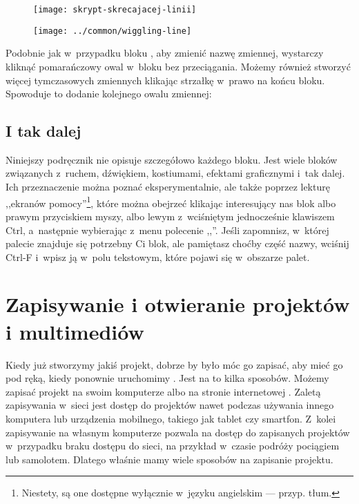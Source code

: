 \documentclass[a4paper]{report}
\begin{document}
\begin{figure}[H]
\begin{minipage}{0.5\textwidth}
\centering
\texttt{[image: skrypt-skrecajacej-linii]}%
\end{minipage}%
\begin{minipage}{0.5\textwidth}
\centering
\texttt{[image: ../common/wiggling-line]}
\end{minipage}%
\end{figure}

Podobnie jak w~przypadku bloku , aby zmienić nazwę zmiennej, wystarczy kliknąć pomarańczowy owal w~bloku  bez przeciągania. Możemy również stworzyć więcej tymczasowych zmiennych klikając strzałkę w~prawo na końcu bloku. Spowoduje to dodanie kolejnego owalu zmiennej:\nopagebreak


\section{I tak dalej}

Niniejszy podręcznik nie opisuje szczegółowo każdego bloku. Jest wiele bloków związanych z~ruchem, dźwiękiem, kostiumami, efektami graficznymi i~tak dalej. Ich przeznaczenie można poznać eksperymentalnie, ale także poprzez lekturę ,,ekranów pomocy''\footnote{Niestety, są one dostępne wyłącznie w~języku angielskim --- przyp. tłum.}, które można obejrzeć klikając interesujący nas blok albo prawym przyciskiem myszy, albo lewym z~wciśniętym jednocześnie klawiszem Ctrl, a~następnie wybierając z~menu polecenie ,,''. Jeśli zapomnisz, w~której palecie znajduje się potrzebny Ci blok, ale pamiętasz choćby część nazwy, wciśnij Ctrl-F i~wpisz ją w~polu tekstowym, które pojawi się w~obszarze palet.

\chapter{Zapisywanie i otwieranie projektów i multimediów}
\label{ch:zapisywanie-i-otwieranie-projektów-i-multimediów}

Kiedy już stworzymy jakiś projekt, dobrze by było móc go zapisać, aby mieć go pod ręką, kiedy ponownie uruchomimy . Jest na to kilka sposobów. Możemy zapisać projekt na swoim komputerze albo na stronie internetowej . Zaletą zapisywania w~sieci jest dostęp do projektów nawet podczas używania innego komputera lub urządzenia mobilnego, takiego jak tablet czy smartfon. Z~kolei zapisywanie na własnym komputerze pozwala na dostęp do zapisanych projektów w~przypadku braku dostępu do sieci, na przykład w~czasie podróży pociągiem lub samolotem. Dlatego właśnie mamy wiele sposobów na zapisanie projektu.
\end{document}
